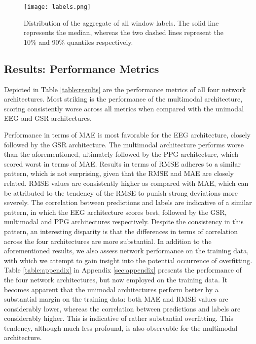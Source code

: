 \documentclass[fleqn,11pt]{paper}
\begin{document}
\vspace{3mm}
\begin{figure}[h]
\centering
\texttt{[image: labels.png]}
\caption{Distribution of the aggregate of all window labels. The solid line represents the median, whereas the two dashed lines represent the 10\% and 90\% quantiles respectively. }\label{fig:labels}
\end{figure}

\subsection{Results: Performance Metrics}
Depicted in Table \ref{table:results} are the performance metrics of all four network architectures. Most striking is the performance of the multimodal architecture, scoring consistently worse across all metrics when compared with the unimodal EEG and GSR architectures.

Performance in terms of MAE is most favorable for the EEG architecture, closely followed by the GSR architecture. The multimodal architecture performs worse than the aforementioned, ultimately followed by the PPG architecture, which scored worst in terms of MAE. Results in terms of RMSE adheres to a similar pattern, which is not surprising, given that the RMSE and MAE are closely related. RMSE values are consistently higher as compared with MAE, which can be attributed to the tendency of the RMSE to punish strong deviations more severely. The correlation between predictions and labels are indicative of a similar pattern, in which the EEG architecture scores best, followed by the GSR, multimodal and PPG architectures respectively. Despite the consistency in this pattern, an interesting disparity is that the differences in terms of correlation across the four architectures are more substantial. In addition to the aforementioned results, we also assess network performance on the training data, with which we attempt to gain insight into the potential occurrence of overfitting. Table \ref{table:appendix} in Appendix \ref{sec:appendix} presents the performance of the four network architectures, but now employed on the training data.  It becomes apparent that the unimodal architectures perform better by a substantial margin on the training data: both MAE and RMSE values are considerably lower, whereas the correlation between predictions and labels are considerably higher. This is indicative of rather substantial overfitting. This tendency, although much less profound, is also observable for the multimodal architecture.
\end{document}
